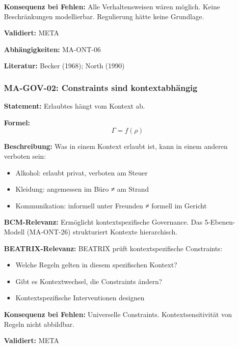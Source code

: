 \textbf{Konsequenz bei Fehlen:}
Alle Verhaltensweisen wären möglich. Keine Beschränkungen modellierbar. Regulierung hätte keine Grundlage.

\textbf{Validiert:} META

\textbf{Abhängigkeiten:} MA-ONT-06

\textbf{Literatur:} Becker (1968); North (1990)


\subsubsection*{MA-GOV-02: Constraints sind kontextabhängig}

\textbf{Statement:} Erlaubtes hängt vom Kontext ab.

\textbf{Formel:}
\begin{equation}
\Gamma = f(\rho)
\end{equation}

\textbf{Beschreibung:}
Was in einem Kontext erlaubt ist, kann in einem anderen verboten sein:
\begin{itemize}
    \item Alkohol: erlaubt privat, verboten am Steuer
    \item Kleidung: angemessen im Büro ≠ am Strand
    \item Kommunikation: informell unter Freunden ≠ formell im Gericht
\end{itemize}

\textbf{BCM-Relevanz:}
Ermöglicht kontextspezifische Governance. Das 5-Ebenen-Modell (MA-ONT-26) strukturiert Kontexte hierarchisch.

\textbf{BEATRIX-Relevanz:}
BEATRIX prüft kontextspezifische Constraints:
\begin{itemize}
    \item Welche Regeln gelten in diesem spezifischen Kontext?
    \item Gibt es Kontextwechsel, die Constraints ändern?
    \item Kontextspezifische Interventionen designen
\end{itemize}

\textbf{Konsequenz bei Fehlen:}
Universelle Constraints. Kontextsensitivität von Regeln nicht abbildbar.

\textbf{Validiert:} META

